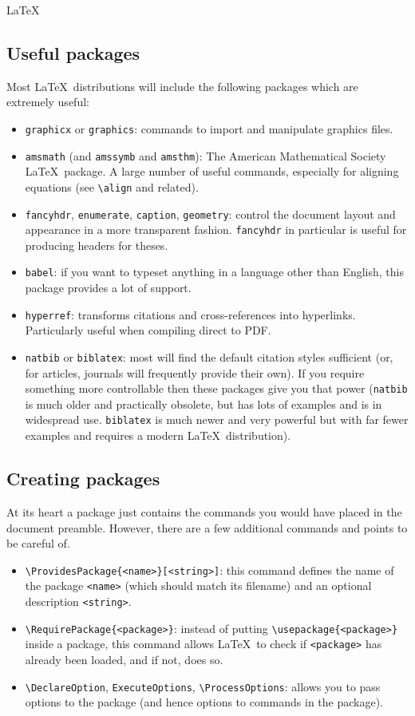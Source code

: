 \begin{chapter}{\LaTeX}
\subsection{Useful packages}
\label{sec:packages_provided}

Most \LaTeX\ distributions will include the following packages which are extremely useful:
\begin{itemize}
\item \texttt{graphicx} or \texttt{graphics}: commands to import and manipulate graphics files.
\item \texttt{amsmath} (and \texttt{amssymb} and \texttt{amsthm}): The American Mathematical Society \LaTeX\ package. A large number of useful commands, especially for aligning equations (see \verb|\align| and related).
\item \texttt{fancyhdr}, \texttt{enumerate}, \texttt{caption}, \texttt{geometry}: control the document layout and appearance in a more transparent fashion. \texttt{fancyhdr} in particular is useful for producing headers for theses.
\item \texttt{babel}: if you want to typeset anything in a language other than English, this package provides a lot of support.
\item \texttt{hyperref}: transforms citations and cross-references into hyperlinks. Particularly useful when compiling direct to PDF.
\item \texttt{natbib} or \texttt{biblatex}: most will find the default citation styles sufficient (or, for articles, journals will frequently provide their own). If you require something more controllable then these packages give you that power (\texttt{natbib} is much older and practically obsolete, but has lots of examples and is in widespread use. \texttt{biblatex} is much newer and very powerful but with far fewer examples and requires a modern \LaTeX\ distribution).
\end{itemize}

\subsection{Creating packages}
\label{sec:packages_creating}

At its heart a package just contains the commands you would have placed in the document preamble. However, there are a few additional commands and points to be careful of.

\begin{itemize}
\item \verb|\ProvidesPackage{<name>}[<string>]|: this command defines the name of the package \verb|<name>| (which should match its filename) and an optional description \verb|<string>|.
\item \verb|\RequirePackage{<package>}|: instead of putting \verb|\usepackage{<package>}| inside a package, this command allows \LaTeX\ to check if \verb|<package>| has already been loaded, and if not, does so.
\item \verb|\DeclareOption|, \verb|ExecuteOptions|, \verb|\ProcessOptions|: allows you to pass options to the package (and hence options to commands in the package).
\end{itemize}


\end{chapter}
